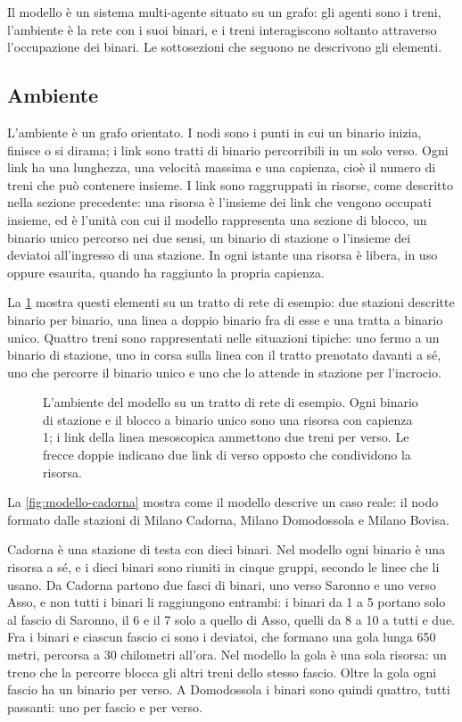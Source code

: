 Il modello è un sistema multi-agente situato su un grafo: gli agenti sono i treni, l'ambiente è la rete con i suoi binari, e i treni interagiscono soltanto attraverso l'occupazione dei binari. Le sottosezioni che seguono ne descrivono gli elementi.

\subsection{Ambiente}
L'ambiente è un grafo orientato. I nodi sono i punti in cui un binario inizia, finisce o si dirama; i link sono tratti di binario percorribili in un solo verso. Ogni link ha una lunghezza, una velocità massima e una capienza, cioè il numero di treni che può contenere insieme. I link sono raggruppati in risorse, come descritto nella sezione precedente: una risorsa è l'insieme dei link che vengono occupati insieme, ed è l'unità con cui il modello rappresenta una sezione di blocco, un binario unico percorso nei due sensi, un binario di stazione o l'insieme dei deviatoi all'ingresso di una stazione. In ogni istante una risorsa è libera, in uso oppure esaurita, quando ha raggiunto la propria capienza.

La \cref{fig:modello-grafo} mostra questi elementi su un tratto di rete di esempio: due stazioni descritte binario per binario, una linea a doppio binario fra di esse e una tratta a binario unico. Quattro treni sono rappresentati nelle situazioni tipiche: uno fermo a un binario di stazione, uno in corsa sulla linea con il tratto prenotato davanti a sé, uno che percorre il binario unico e uno che lo attende in stazione per l'incrocio.

\begin{figure}[H]
	\centering
	
	\caption{L'ambiente del modello su un tratto di rete di esempio. Ogni binario di stazione e il blocco a binario unico sono una risorsa con capienza 1; i link della linea mesoscopica ammettono due treni per verso. Le frecce doppie indicano due link di verso opposto che condividono la risorsa.}
	\label{fig:modello-grafo}
\end{figure}

La \cref{fig:modello-cadorna} mostra come il modello descrive un caso reale: il nodo formato dalle stazioni di Milano Cadorna, Milano Domodossola e Milano Bovisa.

Cadorna è una stazione di testa con dieci binari. Nel modello ogni binario è una risorsa a sé, e i dieci binari sono riuniti in cinque gruppi, secondo le linee che li usano. Da Cadorna partono due fasci di binari, uno verso Saronno e uno verso Asso, e non tutti i binari li raggiungono entrambi: i binari da 1 a 5 portano solo al fascio di Saronno, il 6 e il 7 solo a quello di Asso, quelli da 8 a 10 a tutti e due. Fra i binari e ciascun fascio ci sono i deviatoi, che formano una gola lunga 650 metri, percorsa a 30 chilometri all'ora. Nel modello la gola è una sola risorsa: un treno che la percorre blocca gli altri treni dello stesso fascio. Oltre la gola ogni fascio ha un binario per verso. A Domodossola i binari sono quindi quattro, tutti passanti: uno per fascio e per verso.

